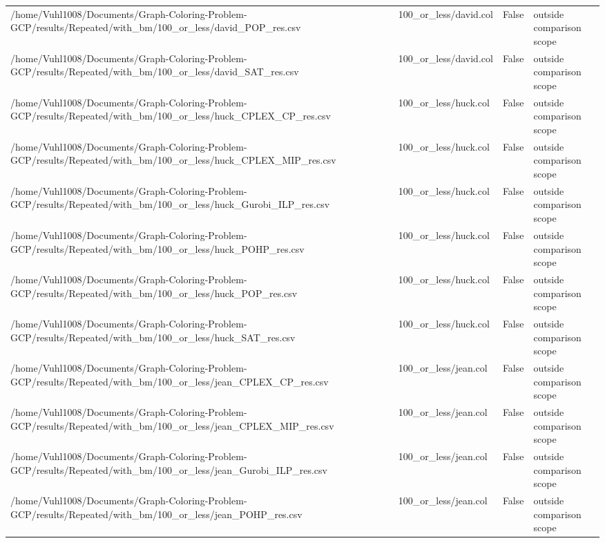 \begin{table}[htbp]
\begin{tabular}{llll}
/home/Vuhl1008/Documents/Graph-Coloring-Problem-GCP/results/Repeated/with\_bm/100\_or\_less/david\_POP\_res.csv & 100\_or\_less/david.col & False & outside comparison scope \\
/home/Vuhl1008/Documents/Graph-Coloring-Problem-GCP/results/Repeated/with\_bm/100\_or\_less/david\_SAT\_res.csv & 100\_or\_less/david.col & False & outside comparison scope \\
/home/Vuhl1008/Documents/Graph-Coloring-Problem-GCP/results/Repeated/with\_bm/100\_or\_less/huck\_CPLEX\_CP\_res.csv & 100\_or\_less/huck.col & False & outside comparison scope \\
/home/Vuhl1008/Documents/Graph-Coloring-Problem-GCP/results/Repeated/with\_bm/100\_or\_less/huck\_CPLEX\_MIP\_res.csv & 100\_or\_less/huck.col & False & outside comparison scope \\
/home/Vuhl1008/Documents/Graph-Coloring-Problem-GCP/results/Repeated/with\_bm/100\_or\_less/huck\_Gurobi\_ILP\_res.csv & 100\_or\_less/huck.col & False & outside comparison scope \\
/home/Vuhl1008/Documents/Graph-Coloring-Problem-GCP/results/Repeated/with\_bm/100\_or\_less/huck\_POHP\_res.csv & 100\_or\_less/huck.col & False & outside comparison scope \\
/home/Vuhl1008/Documents/Graph-Coloring-Problem-GCP/results/Repeated/with\_bm/100\_or\_less/huck\_POP\_res.csv & 100\_or\_less/huck.col & False & outside comparison scope \\
/home/Vuhl1008/Documents/Graph-Coloring-Problem-GCP/results/Repeated/with\_bm/100\_or\_less/huck\_SAT\_res.csv & 100\_or\_less/huck.col & False & outside comparison scope \\
/home/Vuhl1008/Documents/Graph-Coloring-Problem-GCP/results/Repeated/with\_bm/100\_or\_less/jean\_CPLEX\_CP\_res.csv & 100\_or\_less/jean.col & False & outside comparison scope \\
/home/Vuhl1008/Documents/Graph-Coloring-Problem-GCP/results/Repeated/with\_bm/100\_or\_less/jean\_CPLEX\_MIP\_res.csv & 100\_or\_less/jean.col & False & outside comparison scope \\
/home/Vuhl1008/Documents/Graph-Coloring-Problem-GCP/results/Repeated/with\_bm/100\_or\_less/jean\_Gurobi\_ILP\_res.csv & 100\_or\_less/jean.col & False & outside comparison scope \\
/home/Vuhl1008/Documents/Graph-Coloring-Problem-GCP/results/Repeated/with\_bm/100\_or\_less/jean\_POHP\_res.csv & 100\_or\_less/jean.col & False & outside comparison scope \\

\end{tabular}
\end{table}

